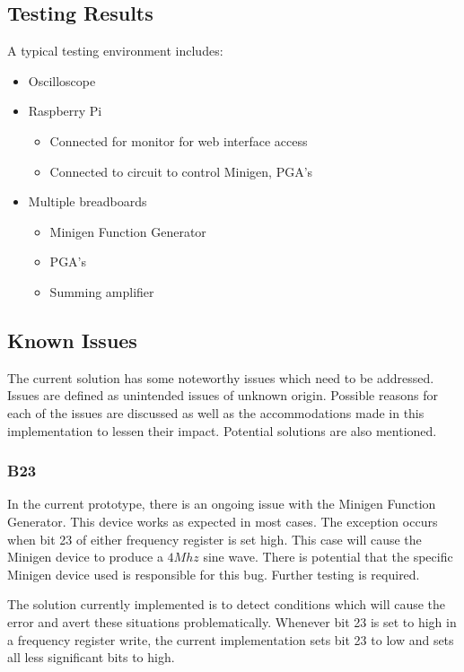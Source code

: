\documentclass{article}	%
\begin{document}
\begin{multicols}{2}

\subsection{Testing Results}

A typical testing environment includes:
\begin{itemize}
\item Oscilloscope
\item Raspberry Pi
  \begin{itemize}
  \item Connected for monitor for web interface access
  \item Connected to circuit to control Minigen, PGA's
  \end{itemize}
\item Multiple breadboards
  \begin{itemize}
  \item Minigen Function Generator
  \item PGA's
  \item Summing amplifier
  \end{itemize}
\end{itemize}


\subsection{Known Issues}
The current solution has some noteworthy issues
which need to be addressed.
Issues are defined as unintended issues of unknown origin.
Possible reasons for each of the issues are discussed as
well as the accommodations made in this implementation to lessen their impact.
Potential solutions are also mentioned.

\subsubsection{B23}
In the current prototype,
there is an ongoing issue with the Minigen Function Generator.
This device works as expected in most cases.
The exception occurs when bit 23 of either frequency register
is set high.
This case will cause the Minigen device to produce a $4Mhz$ sine wave.
There is potential that the specific Minigen device used 
is responsible for this bug.
Further testing is required.

The solution currently implemented is
to detect conditions which will cause the error
and avert these situations problematically.
Whenever bit 23 is set to high in a frequency register write,
the current implementation sets bit 23 to low
and sets all less significant bits to high.


\end{multicols}
\end{document}
